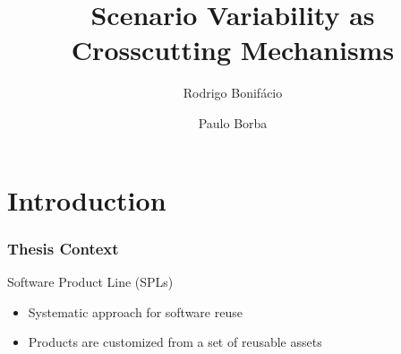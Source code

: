 \documentclass[xcolor=svgnames]{beamer}
\title{Scenario Variability as Crosscutting Mechanisms}
\author{Rodrigo Bonif\'{a}cio \and Paulo Borba}
\institute
{
	Informatics Center \\ Federal University of Pernambuco \\ Brazil
}
\begin{document}
\lstset{language=haskell}

\begin{frame}
\titlepage
\end{frame}

\section{Introduction}

% 
 
 \begin{frame}
 \frametitle{Thesis Context}
 
\begin{block}{Software Product Line (SPLs)}
 \begin{itemize}
\item Systematic approach for software reuse
\item Products are customized from a set of reusable assets
\end{itemize}
\end{block}
 
 \end{frame}
\end{document}
